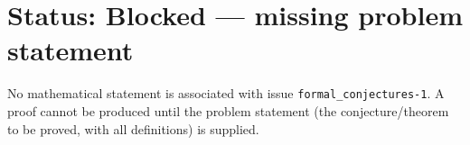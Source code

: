 \documentclass[12pt]{article}
\begin{document}
\section*{Status: Blocked --- missing problem statement}
No mathematical statement is associated with issue \texttt{formal\_conjectures-1}.
A proof cannot be produced until the problem statement (the conjecture/theorem
to be proved, with all definitions) is supplied.
\end{document}
